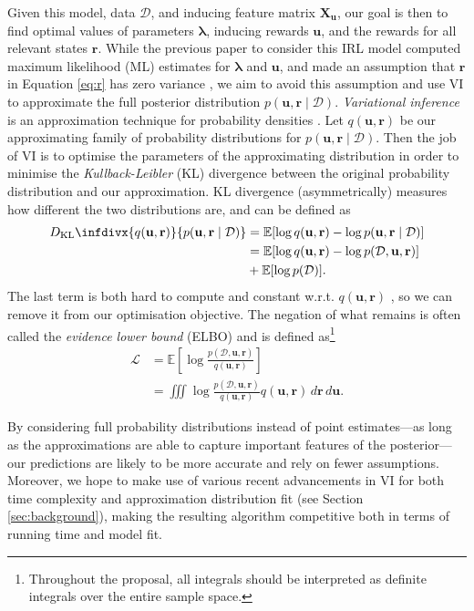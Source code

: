 \documentclass{mpaper}
\newcommand{\DKL}{D_{\mathrm{KL}}\infdivx}
\newcommand{\dx}{\,d\mathbf{r}\,d\mathbf{u}}
\newcommand{\pfull}{p(\mathcal{D}, \mathbf{u}, \mathbf{r})}
\newcommand{\approximation}{q(\mathbf{u}, \mathbf{r})}
\newcommand{\posterior}{p(\mathbf{u}, \mathbf{r} \mid \mathcal{D})}
\begin{document}
Given this model, data $\mathcal{D}$, and inducing feature matrix
$\mathbf{X_u}$, our goal is then to find optimal values of parameters
$\bm\lambda$, inducing rewards $\mathbf{u}$, and the rewards for all relevant
states $\mathbf{r}$. While the previous paper to consider this IRL model
computed maximum likelihood (ML) estimates for $\bm\lambda$ and $\mathbf{u}$,
and made an assumption that $\mathbf{r}$ in Equation \ref{eq:r} has zero variance
\cite{DBLP:conf/nips/LevinePK11}, we aim to avoid this assumption and use
VI to approximate the full posterior distribution $\posterior$.
\emph{Variational inference} is an approximation technique for probability
densities \cite{blei2017variational}. Let $\approximation$ be our approximating
family of probability distributions for $\posterior$. Then the job of VI is to
optimise the parameters of the approximating distribution in order to minimise
the \emph{Kullback-Leibler} (KL) divergence between the original probability
distribution and our approximation.  KL divergence (asymmetrically) measures how
different the two distributions are, and can be defined as
\cite{blei2017variational}
\begin{align*}
  \DKL{\approximation}{\posterior} &= \mathbb{E}[\log\approximation - \log\posterior ] \\
                                   &= \mathbb{E}[\log\approximation - \log\pfull] \\
                                   &+ \mathbb{E}[\log p(\mathcal{D})].
\end{align*}
The last term is both hard to compute and constant w.r.t. $\approximation$
\cite{blei2017variational}, so we can remove it from our optimisation objective.
The negation of what remains is often called the \emph{evidence lower bound}
(ELBO) and is defined as\footnote{Throughout the proposal, all integrals should
  be interpreted as definite integrals over the entire sample space.}
\cite{DBLP:books/lib/Bishop07,blei2017variational}
\begin{equation} \label{eq:elbo}
  \begin{split}
    \mathcal{L} &= \mathbb{E}\left[ \log \frac{\pfull}{\approximation} \right] \\
    &= \iiint \log \frac{\pfull}{\approximation} \approximation\dx.
  \end{split}
\end{equation}

By considering full probability distributions instead of point estimates---as
long as the approximations are able to capture important features of the
posterior---our predictions are likely to be more accurate and rely on fewer
assumptions. Moreover, we hope to make use of various recent advancements in VI
for both time complexity and approximation distribution fit (see Section
\ref{sec:background}), making the resulting algorithm competitive both in terms of
running time and model fit.
\end{document}
